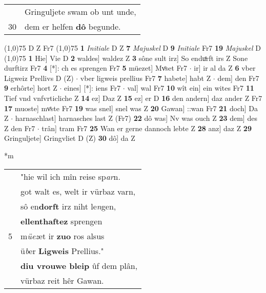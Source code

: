 \documentclass[8pt,a4paper,notitlepage]{article}
\begin{document}
\begin{table}[ht]
\begin{minipage}[t]{0.5\linewidth}
\begin{tabular}{rl}
 & Gringuljete swam ob unt unde,\\ 
30 & dem er helfen \textbf{dô} begunde.\\ 
\end{tabular}
\scriptsize
\line(1,0){75} \newline
D Z Fr7 \newline
\line(1,0){75} \newline
\textbf{1} \textit{Initiale} D Z  \textbf{7} \textit{Majuskel} D  \textbf{9} \textit{Initiale} Fr7  \textbf{19} \textit{Majuskel} D  \newline
\line(1,0){75} \newline
\textbf{1} Hie] Vie D \textbf{2} waldes] waldez Z \textbf{3} sône sult irz] So enduͤrft irs Z Sone durftirz Fr7 \textbf{4} [*]: ch es sprengen Fr7 \textbf{5} müezet] Mvͦset Fr7  $\cdot$ ir] ir al da Z \textbf{6} vber Ligweiz Prellivs D (Z)  $\cdot$ vber ligweis prellius Fr7 \textbf{7} habete] habt Z  $\cdot$ dem] den Fr7 \textbf{9} erhôrte] hort Z  $\cdot$ eines] [*]: iens Fr7  $\cdot$ val] wal Fr7 \textbf{10} wît ein] ein wites Fr7 \textbf{11} Tief vnd vnfvrticliche Z \textbf{14} ez] Daz Z \textbf{15} ez] er D \textbf{16} den andern] daz ander Z Fr7 \textbf{17} muoste] mvͤste Fr7 \textbf{19} was snel] snel was Z \textbf{20} Gawan] ::wan Fr7 \textbf{21} doch] Da Z  $\cdot$ harnaschlast] harnasches last Z (Fr7) \textbf{22} dô was] Nv was ouch Z \textbf{23} dem] des Z den Fr7  $\cdot$ trân] tram Fr7 \textbf{25} Wan er gerne dannoch lebte Z \textbf{28} anz] daz Z \textbf{29} Gringuljete] Gringvliet D (Z) \textbf{30} dô] da Z \newline
\end{minipage}
\hspace{0.5cm}
\begin{minipage}[t]{0.5\linewidth}
\small
\begin{center}*m
\end{center}
\begin{tabular}{rl}
 & "hie wil ich mîn reise sp\textit{ar}n.\\ 
 & got walt es, welt ir vürbaz varn,\\ 
 & sô en\textbf{dorft} irz niht le\textit{n}gen,\\ 
 & \textbf{ellenthaftez} sprengen\\ 
5 & m\textit{üez}et ir \textbf{zuo} ros alsus\\ 
 & ü\textit{b}er \textbf{Ligweis} Prellius."\\ 
 & \textbf{diu vrouwe bleip} ûf dem plân,\\ 
 & vürbaz reit hêr Gawan.\\ 

\end{tabular}
\end{minipage}
\end{table}
\end{document}

